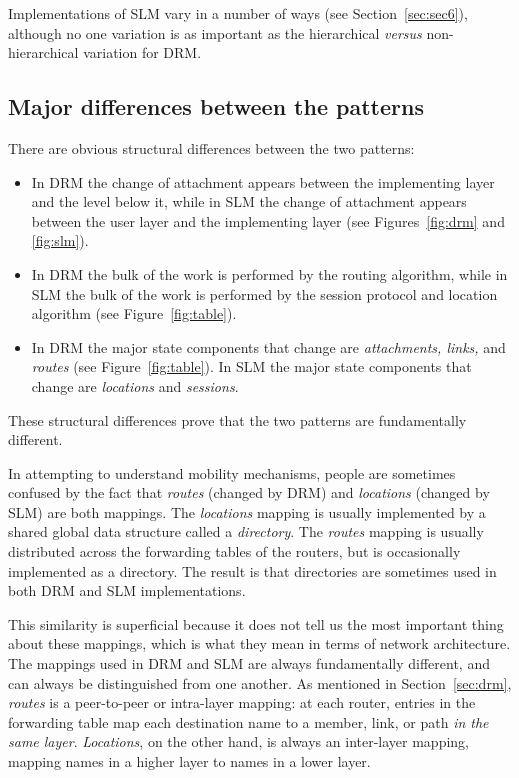 Implementations of SLM vary in a number of ways
(see Section~\ref{sec:sec6}),
although no one variation is as important as the hierarchical {\it versus}
non-hierarchical
variation for DRM.

\subsection{Major differences between the patterns}
\label{sec:majordifferences}

There are obvious structural differences between the two patterns:
\begin{itemize}
\item
In DRM the change of attachment appears between the implementing layer
and the level 
below it, while in SLM the change of attachment appears between
the user layer and the implementing layer 
(see Figures~\ref{fig:drm} and \ref{fig:slm}).
\item
In DRM the bulk of the work is performed by the routing algorithm,
while in SLM the bulk of the work is performed by the session protocol
and location algorithm (see Figure~\ref{fig:table}).
\item
In DRM the major state components that change are {\it attachments, links,}
and {\it routes} 
(see Figure~\ref{fig:table}).
In SLM the major state components that change are {\it locations}
and {\it sessions}. 
\end{itemize}
These structural differences prove that the two patterns are
fundamentally different.

In attempting to understand mobility mechanisms, people are sometimes
confused by the fact that {\it routes} (changed by DRM) and 
{\it locations} (changed by SLM) are both mappings.
The {\it locations} mapping is usually implemented by a shared global
data structure called a
{\it directory}.
The {\it routes} mapping is usually distributed across the forwarding
tables of the routers, but is occasionally implemented as a directory.
The result is that directories are sometimes used in both DRM and SLM
implementations.

This similarity is superficial because it does not tell
us the most important thing about
these mappings, which is what they mean in terms of
network architecture.
The mappings used in DRM and SLM are always fundamentally different, and
can always be distinguished from one another.
As mentioned in Section~\ref{sec:drm},
{\it routes} is a peer-to-peer or intra-layer mapping:
at each router, entries in the forwarding
table map each destination name to a member, link, or path {\it in the
same layer}. 
{\it Locations}, on the other hand, is always an inter-layer mapping,
mapping names in a higher layer to names in a lower layer.

